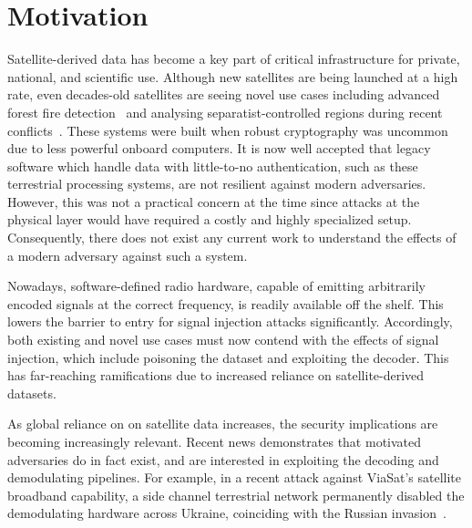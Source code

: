 \section{Motivation}


Satellite-derived data has become a key part of critical infrastructure for private, national, and scientific use.
Although new satellites are being launched at a high rate, even decades-old satellites are seeing novel use cases including advanced forest fire detection~\cite{nasaFirms} and analysing separatist-controlled regions during recent conflicts~\cite{separatistLuminosity}. %
These systems were built when robust cryptography was uncommon due to less powerful onboard computers.
It is now well accepted that legacy software which handle data with little-to-no authentication, such as these terrestrial processing systems, are not resilient against modern adversaries.
However, this was not a practical concern at the time since attacks at the physical layer would have required a costly and highly specialized setup.
Consequently, there does not exist any current work to understand the effects of a modern adversary against such a system.

Nowadays, software-defined radio hardware, capable of emitting arbitrarily encoded signals at the correct frequency, is readily available off the shelf.
This lowers the barrier to entry for signal injection attacks significantly.
Accordingly, both existing and novel use cases must now contend with the effects of signal injection, which include poisoning the dataset and exploiting the decoder.
This has far-reaching ramifications due to increased reliance on satellite-derived datasets.


As global reliance on on satellite data increases, the security implications are becoming increasingly relevant.
Recent news demonstrates that motivated adversaries do in fact exist, and are interested in exploiting the decoding and demodulating pipelines.
For example, in a recent attack against ViaSat's satellite broadband capability, a side channel terrestrial network permanently disabled the demodulating hardware across Ukraine, coinciding with the Russian invasion~\cite{satcomAnalysis}.

